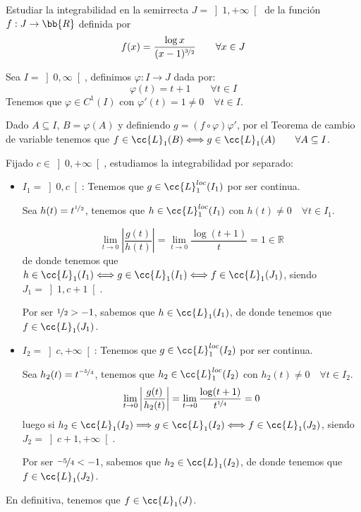 \begin{ejercicio} Estudiar la integrabilidad
    en la semirrecta $J=\left]1,+\infty\right[$ de la función $f:J\to \bb{R}$ definida por
    \begin{equation*}
        f(x) = \frac{\log x}{(x-1)^{\nicefrac{3}{2}}}       \qquad \forall x\in J
    \end{equation*}

    Sea $I=\left]0, \infty\right[$, definimos $\varphi:I\longrightarrow J$ dada por:
    \begin{equation*}
        \varphi(t)= t+1\qquad \forall t\in I
    \end{equation*}
    Tenemos que $\varphi \in C^1(I)$ con $\varphi'(t)=1\neq 0\quad \forall t\in I$.

    Dado $A\subseteq I$, $B=\varphi(A)$ y definiendo $g=(f\circ \varphi)\varphi'$, por el Teorema de cambio de variable tenemos que $f\in \cc{L}_1(B)\Longleftrightarrow g\in \cc{L}_1(A)\qquad \forall A\subseteq I$.

    Fijado $c\in \left]0,+\infty\right[$, estudiamos la integrabilidad por separado:
    \begin{itemize}
        \item \underline{$I_1 = \left]0, c\right[$}:
            Tenemos que $g\in \cc{L}_1^{loc}(I_1)$ por ser continua.

            Sea $h(t) = t^{\nicefrac{1}{2}}$, tenemos que $h\in \cc{L}_1^{loc}(I_1)$ con $h(t)\neq 0\quad \forall t\in I_1$.

            \begin{equation*}
                \lim_{t\to0}\left|\dfrac{g(t)}{h(t)}\right| = \lim_{t\to0}\dfrac{\log(t+1)}{t} = 1\in \mathbb{R}
            \end{equation*}
            de donde tenemos que $h\in \cc{L}_1(I_1)\Longleftrightarrow g\in \cc{L}_1(I_1)\Longleftrightarrow f\in \cc{L}_1(J_1)$, siendo $J_1 = \left]1,c+1\right[$.

            Por ser $\nicefrac{1}{2}>-1$, sabemos que $h\in \cc{L}_1(I_1)$, de donde tenemos que $f\in \cc{L}_1(J_1)$.

        \item \underline{$I_2 = \left]c, +\infty\right[$}: Tenemos que $g\in \cc{L}_1^{loc}(I_2)$ por ser continua.

            Sea $h_2(t)=t^{\nicefrac{-5}{4}}$, tenemos que $h_2\in \cc{L}_1^{loc}(I_2)$ con $h_2(t)\neq 0\quad \forall t\in I_2$.
            \begin{equation*}
                \lim_{t\to0}\left|\dfrac{g(t)}{h_2(t)}\right| = \lim_{t\to0}\dfrac{\log(t+1)}{t^{\nicefrac{1}{4}}} = 0
            \end{equation*}
            luego si $h_2\in \cc{L}_1(I_2)\Longrightarrow g\in \cc{L}_1(I_2)\Longleftrightarrow f\in \cc{L}_1(J_2)$, siendo $J_2=\left]c+1,+\infty\right[$.

            Por ser $\nicefrac{-5}{4}< -1$, sabemos que $h_2\in \cc{L}_1(I_2)$, de donde tenemos que $f\in \cc{L}_1(J_2)$.
    \end{itemize}
    En definitiva, tenemos que $f\in \cc{L}_1(J)$.
\end{ejercicio}

